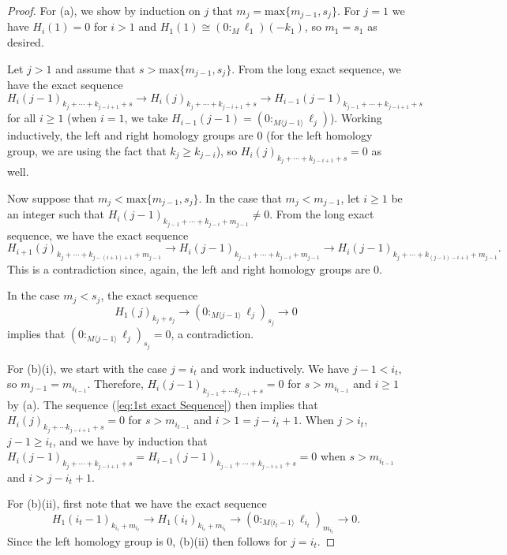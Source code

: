 \documentclass[a4paper, 10pt, reqno, english, ones]{amsart}  %
\theoremstyle{definition}
\theoremstyle{remark}
\begin{document}
\begin{proof}
     For (a), we show by induction on $j$ that $m_j=\textrm{max}\{m_{j-1},s_j\}$. For $j=1$ we have $H_i(1)=0$ for $i>1$ and $H_1(1) \cong (0:_M \ell_1)(-k_1)$, so $m_1 = s_1$ as desired.

    Let $j>1$ and assume that $s>\textrm{max}\{m_{j-1},s_j \}$. From the long exact sequence, we have the exact sequence
    \begin{equation}\label{eq:1st exact Sequence}
        H_i(j-1)_{k_j+\cdots + k_{j-i+1} + s} \longrightarrow H_i(j)_{k_j+\cdots + k_{j-i+1} + s} \longrightarrow H_{i-1}(j-1)_{k_{j-1}+\cdots + k_{j-i+1} + s}
    \end{equation}
    for all $i\geq 1$ (when $i=1$, we take $H_{i-1}(j-1) = (0:_{M\langle j-1 \rangle} \ell_j)$). Working inductively, the left and right homology groups are $0$ (for the left homology group, we are using the fact that $k_j\geq k_{j-i}$), so $H_i(j)_{k_j+\cdots + k_{j-i+1} + s}=0$ as well. 

    Now suppose that $m_j < \textrm{max}\{m_{j-1},s_j\}$. In the case that $m_j < m_{j-1}$, let $i\geq 1$ be an integer such that $H_i(j-1)_{k_{j-1}+\cdots+k_{j-i}+m_{j-1}}\neq 0$. From the long exact sequence, we have the exact sequence
    \[
    H_{i+1}(j)_{k_{j}+\cdots+k_{j-(i+1)+1}+m_{j-1}} \longrightarrow H_i(j-1)_{k_{j-1}+\cdots+k_{j-i}+m_{j-1}}\longrightarrow H_i(j-1)_{k_{j}+\cdots+k_{(j-1)-i+1}+m_{j-1}}.
    \]
    This is a contradiction since, again, the left and right homology groups are $0$.

    In the case $m_j<s_j$, the exact sequence
    \[
    H_1(j)_{k_j+s_j} \longrightarrow (0:_{M\langle j-1 \rangle} \ell_j)_{s_j} \longrightarrow 0
    \]
    implies that $(0:_{M\langle j-1 \rangle} \ell_j)_{s_j}=0$, a contradiction.

    For (b)(i), we start with the case $j=i_t$ and work inductively. We have $j-1 < i_t$, so $m_{j-1} = m_{i_{t-1}}$. Therefore, $H_i(j-1)_{k_{j-1} + \cdots k_{j-i}+s}=0$ for $s>m_{i_{t-1}}$ and $i\geq 1$ by (a). The sequence (\ref{eq:1st exact Sequence}) then implies that $H_i(j)_{k_j+\cdots k_{j-i+1} + s}=0$ for $s>m_{i_{t-1}}$ and $i>1=j-i_t+1$. When $j>i_t$, $j-1\geq i_t$, and we have by induction that $H_i(j-1)_{k_{j} + \cdots + k_{j-i+1}+s}=H_{i-1}(j-1)_{k_{j-1} + \cdots + k_{j-i+1}+s}=0$ when $s>m_{i_{t-1}}$ and $i>j-i_t+1$.

    For (b)(ii), first note that we have the exact sequence
    \[
    H_1(i_t-1)_{k_{i_t}+m_{i_t}} \longrightarrow H_1(i_t)_{k_{i_t}+m_{i_t}} \longrightarrow (0:_{M\langle i_t-1 \rangle} \ell_{i_t})_{m_{i_t}}\longrightarrow 0.
    \]
    Since the left homology group is $0$, (b)(ii) then follows for $j=i_t$.


\end{proof}
\end{document}
